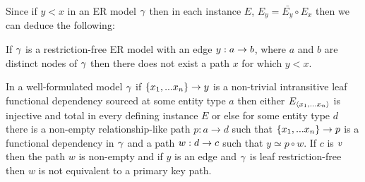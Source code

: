 Since if $y < x$ in an ER model $\gamma$ then in each instance $E$, $E_y = \bar{E_y} \circ E_x$
then we can deduce the following:
\begin{observation}
If $\gamma$ is a restriction-free  ER model with an edge $y:a \rightarrow b$, where  $a$ and $b$ are distinct nodes of $\gamma$ then there does not exist a path  $x$ for which $y < x$.
\end{observation}

\begin{lemma}
\label{intransitivelemma}
In a well-formulated model $\gamma$  if $\left\{x_1,...x_n\right\} \rightarrow y$  is a non-trivial intransitive leaf
functional dependency sourced at some entity type $a$ then either $E_{\langle x_1,...x_n\rangle}$ is injective and total in every defining instance $E$ 
or else for some entity type $d$ there is a non-empty relationship-like path $p:a \rightarrow d$ such that $\{x_1,...x_n\} \rightarrow p$ is a functional dependency in $\gamma$
and a  path $w:d \rightarrow c$  such that $y \simeq p \circ w$. If $c$ is $v$ then
the path $w$ is non-empty and if $y$ is an edge and $\gamma$ is leaf restriction-free then $w$ is not equivalent to a primary key path.
\end{lemma}
